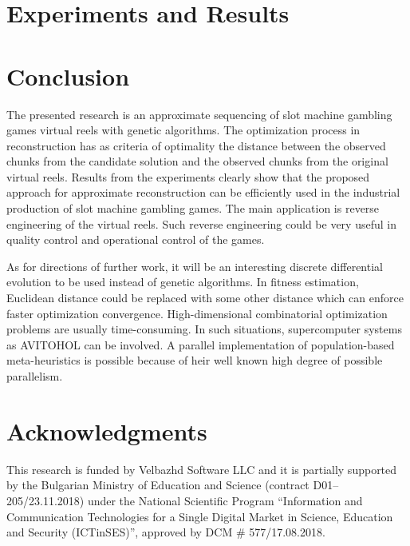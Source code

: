 \documentclass[11pt]{article}
\begin{document}
\section{Experiments and Results}

\section{Conclusion}

The presented research is an approximate sequencing of slot machine gambling games virtual reels with genetic algorithms. The optimization process in reconstruction has as criteria of optimality the distance between the observed chunks from the candidate solution and the observed chunks from the original virtual reels. Results from the experiments clearly show that the proposed approach for approximate reconstruction can be efficiently used in the industrial production of slot machine gambling games. The main application is reverse engineering of the virtual reels. Such reverse engineering could be very useful in quality control and operational control of the games. 

As for directions of further work, it will be an interesting discrete differential evolution to be used instead of genetic algorithms. In fitness estimation, Euclidean distance could be replaced with some other distance which can enforce faster optimization convergence. High-dimensional combinatorial optimization problems are usually time-consuming. In such situations, supercomputer systems as AVITOHOL \cite{Tashev-Tasheva-Petrov-2019} can be involved. A parallel implementation of population-based meta-heuristics is possible because of heir well known high degree of possible parallelism.

\section*{Acknowledgments}

This research is funded by Velbazhd Software LLC and it is partially supported by the Bulgarian Ministry of Education and Science (contract D01–205/23.11.2018) under the National Scientific Program ``Information and Communication Technologies for a Single Digital Market in Science, Education and Security (ICTinSES)'', approved by DCM \# 577/17.08.2018.
\end{document}
